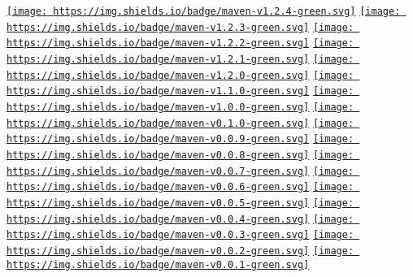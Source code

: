 \documentclass[
]{book}
\begin{document}
\href{https://search.maven.org/search?q=g:com.github.fangjinuo.langx\%20AND\%20v:1.2.4}{\texttt{[image: https://img.shields.io/badge/maven-v1.2.4-green.svg]}}
\href{https://search.maven.org/search?q=g:com.github.fangjinuo.langx\%20AND\%20v:1.2.3}{\texttt{[image: https://img.shields.io/badge/maven-v1.2.3-green.svg]}}
\href{https://search.maven.org/search?q=g:com.github.fangjinuo.langx\%20AND\%20v:1.2.2}{\texttt{[image: https://img.shields.io/badge/maven-v1.2.2-green.svg]}}
\href{https://search.maven.org/search?q=g:com.github.fangjinuo.langx\%20AND\%20v:1.2.1}{\texttt{[image: https://img.shields.io/badge/maven-v1.2.1-green.svg]}}
\href{https://search.maven.org/search?q=g:com.github.fangjinuo.langx\%20AND\%20v:1.2.0}{\texttt{[image: https://img.shields.io/badge/maven-v1.2.0-green.svg]}}
\href{https://search.maven.org/search?q=g:com.github.fangjinuo.langx\%20AND\%20v:1.1.0}{\texttt{[image: https://img.shields.io/badge/maven-v1.1.0-green.svg]}}
\href{https://search.maven.org/search?q=g:com.github.fangjinuo.langx\%20AND\%20v:1.0.0}{\texttt{[image: https://img.shields.io/badge/maven-v1.0.0-green.svg]}}
\href{https://search.maven.org/search?q=g:com.github.fangjinuo.langx\%20AND\%20v:0.1.0}{\texttt{[image: https://img.shields.io/badge/maven-v0.1.0-green.svg]}}
\href{https://search.maven.org/search?q=g:com.github.fangjinuo.langx\%20AND\%20v:0.0.9}{\texttt{[image: https://img.shields.io/badge/maven-v0.0.9-green.svg]}}
\href{https://search.maven.org/search?q=g:com.github.fangjinuo.langx\%20AND\%20v:0.0.8}{\texttt{[image: https://img.shields.io/badge/maven-v0.0.8-green.svg]}}
\href{https://search.maven.org/search?q=g:com.github.fangjinuo.langx\%20AND\%20v:0.0.7}{\texttt{[image: https://img.shields.io/badge/maven-v0.0.7-green.svg]}}
\href{https://search.maven.org/search?q=g:com.github.fangjinuo.langx\%20AND\%20v:0.0.6}{\texttt{[image: https://img.shields.io/badge/maven-v0.0.6-green.svg]}}
\href{https://search.maven.org/search?q=g:com.github.fangjinuo.langx\%20AND\%20v:0.0.5}{\texttt{[image: https://img.shields.io/badge/maven-v0.0.5-green.svg]}}
\href{https://search.maven.org/search?q=g:com.github.fangjinuo.langx\%20AND\%20v:0.0.4}{\texttt{[image: https://img.shields.io/badge/maven-v0.0.4-green.svg]}}
\href{https://search.maven.org/search?q=g:com.github.fangjinuo.langx\%20AND\%20v:0.0.3}{\texttt{[image: https://img.shields.io/badge/maven-v0.0.3-green.svg]}}
\href{https://search.maven.org/search?q=g:com.github.fangjinuo.langx\%20AND\%20v:0.0.2}{\texttt{[image: https://img.shields.io/badge/maven-v0.0.2-green.svg]}}
\href{https://search.maven.org/search?q=g:com.github.fangjinuo.langx\%20AND\%20v:0.0.1}{\texttt{[image: https://img.shields.io/badge/maven-v0.0.1-green.svg]}}
\end{document}
